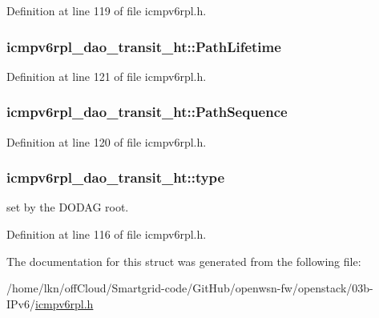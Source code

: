 Definition at line 119 of file icmpv6rpl.\+h.

\subsubsection[{\texorpdfstring{Path\+Lifetime}{PathLifetime}}]{ icmpv6rpl\+\_\+dao\+\_\+transit\+\_\+ht\+::\+Path\+Lifetime}\hypertarget{structicmpv6rpl__dao__transit__ht_ad6f4184cf16bf1c50c9212f0c66dc7b5}{}\label{structicmpv6rpl__dao__transit__ht_ad6f4184cf16bf1c50c9212f0c66dc7b5}


Definition at line 121 of file icmpv6rpl.\+h.

\subsubsection[{\texorpdfstring{Path\+Sequence}{PathSequence}}]{ icmpv6rpl\+\_\+dao\+\_\+transit\+\_\+ht\+::\+Path\+Sequence}\hypertarget{structicmpv6rpl__dao__transit__ht_acb45c31db8e5133099a91e4e96e7cc78}{}\label{structicmpv6rpl__dao__transit__ht_acb45c31db8e5133099a91e4e96e7cc78}


Definition at line 120 of file icmpv6rpl.\+h.

\subsubsection[{\texorpdfstring{type}{type}}]{ icmpv6rpl\+\_\+dao\+\_\+transit\+\_\+ht\+::type}\hypertarget{structicmpv6rpl__dao__transit__ht_a6fde2b373c11770b5c55317c4a776ee4}{}\label{structicmpv6rpl__dao__transit__ht_a6fde2b373c11770b5c55317c4a776ee4}


set by the D\+O\+D\+AG root. 



Definition at line 116 of file icmpv6rpl.\+h.



The documentation for this struct was generated from the following file\+:\begin{DoxyCompactItemize}
\item 
/home/lkn/off\+Cloud/\+Smartgrid-\/code/\+Git\+Hub/openwsn-\/fw/openstack/03b-\/\+I\+Pv6/\hyperlink{icmpv6rpl_8h}{icmpv6rpl.\+h}\end{DoxyCompactItemize}
